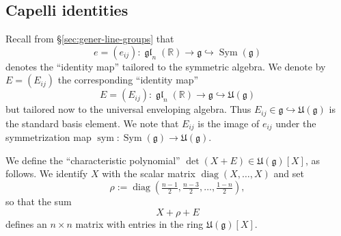 \documentclass[reqno]{amsart}
\DeclareMathOperator{\glLie}{\mathfrak{g}\mathfrak{l}}
\DeclareMathOperator{\diag}{diag}
\DeclareMathOperator{\Sym}{Sym}
\DeclareMathOperator{\sym}{sym}
\theoremstyle{plain} \newtheorem{theorem} {Theorem}
\theoremstyle{definition} \newtheorem{definition} [theorem] {Definition}
\theoremstyle{itplain} %
\numberwithin{equation}{section}
\numberwithin{theorem}{section}
\begin{document}
\subsection{Capelli identities}
Recall from \S\ref{sec:gener-line-groups} that
\begin{equation*}
  e = (e_{ij }) : \glLie_n(\mathbb{R}) \rightarrow \mathfrak{g} \hookrightarrow \Sym(\mathfrak{g})
\end{equation*}
denotes the ``identity map'' tailored to the symmetric algebra.  We denote by $E = (E_{i j})$ the corresponding ``identity map''
\[
  E = (E_{i j}) : \glLie_n(\mathbb{R}) \rightarrow \mathfrak{g} \hookrightarrow \mathfrak{U}(\mathfrak{g})
\]
but tailored now to the universal enveloping algebra.  Thus $E_{i j} \in \mathfrak{g} \hookrightarrow \mathfrak{U}(\mathfrak{g})$ is the standard basis element.  We note that $E_{i j}$ is the image of $e_{i j}$ under the symmetrization map $\sym : \Sym(\mathfrak{g}) \rightarrow \mathfrak{U}(\mathfrak{g})$.

We define the ``characteristic polynomial'' $\det(X+E) \in \mathfrak{U}(\mathfrak{g})[X]$, as follows.  We identify $X$ with the scalar matrix $\diag(X,\dotsc,X)$ and set
\[
  \rho := \diag \left( \tfrac{n-1}{2}, \tfrac{n-3}{2}, \dotsc , \tfrac{1-n}{2} \right),
\]
so that the sum
\[
  X + \rho + E
\]
defines an $n \times n$ matrix with entries in the ring $\mathfrak{U}(\mathfrak{g})[X]$.
\end{document}
